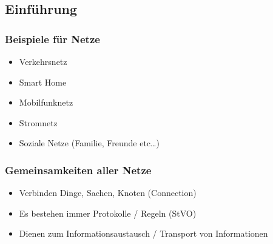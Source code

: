 \documentclass[12pt,a4paper]{article}
\begin{document}
\subsection{Einführung}
\subsubsection{Beispiele für Netze}
\begin{itemize}
\item Verkehrsnetz
\item Smart Home
\item Mobilfunknetz
\item Stromnetz
\item Soziale Netze (Familie, Freunde etc\dots)
\end{itemize}
\subsubsection{Gemeinsamkeiten aller Netze}
\begin{itemize}
\item Verbinden Dinge, Sachen, Knoten (Connection)
\item Es bestehen immer Protokolle / Regeln (StVO)
\item Dienen zum Informationsaustausch / Transport von Informationen
\end{itemize}
\end{document}
